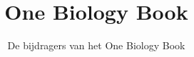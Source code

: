 \documentclass[11pt,a4paper,twoside,openany]{book}
\title{One Biology Book}
\author{De bijdragers van het One Biology Book}
\date{\bookdate}
\begin{document}
\frontmatter




\tableofcontents

\mainmatter



\appendix
\part{\omsolutionspart}


\backmatter
\printindex
\end{document}
